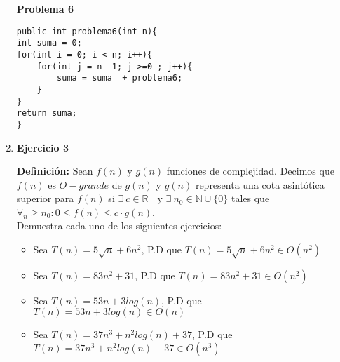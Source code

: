 \documentclass[a4paper,10pt]{article}
\begin{document}
\begin{enumerate}
 \textbf{Problema 6}
\begin{lstlisting}[frame = single]
public int problema6(int n){
int suma = 0;
for(int i = 0; i < n; i++){
    for(int j = n -1; j >=0 ; j++){
        suma = suma  + problema6;
    }
}
return suma;
}
\end{lstlisting}

\item \textbf{Ejercicio 3}

        \textbf{Definición:} Sean $f(n)$ y $g(n)$ funciones de complejidad. Decimos que $f(n)$ es $O-grande$ de $g(n)$ y $g(n)$ representa una cota asintótica superior para $f(n)$ si $\exists \: c \in \mathds{R^+}$  y $\exists \: n_0 \in \mathds{N}\cup \{0\}$ tales que $\forall _n\geq n_0 : 0 \leq f(n) \leq c \cdot g(n)$.\\

        Demuestra cada uno de los siguientes ejercicios:
\begin{itemize}
    \item Sea $T(n) = 5\sqrt{n} + 6n^2 $, P.D que $T(n) = 5\sqrt{n} + 6n^2 \in O(n^2) $
    \item Sea $T(n) = 83 n^2 + 31 $, P.D que $T(n) = 83 n^2 + 31  \in O(n^2) $
    \item Sea $T(n) = 53n + 3 log(n) $, P.D que $T(n) = 53n + 3 log(n)   \in O(n) $
     \item Sea $T(n) = 37n^3 + n^2log(n) + 37 $, P.D que $T(n) =  37n^3 + n^2log(n) + 37  \in O(n^3) $
    
\end{itemize}








\end{enumerate}
\end{document}
